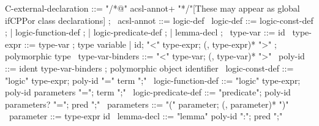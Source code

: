 \begin{syntax}
  C-external-declaration ::= "/*@" acsl-annot+ "*/"[These may appear as global ifCPP{or class} declarations] ;
  \
  acsl-annot ::= logic-def
  \
  logic-def ::= logic-const-def ;
          | logic-function-def ;
          | logic-predicate-def ;
          | lemma-decl ;
  \
  type-var ::= id
  \
  type-expr ::= type-var ; type variable
  | id;
    "<" type-expr;
    (, type-expr)* ">" ; polymorphic type
  \
  type-var-binders ::= "<" type-var;
                       (, type-var)* ">"
  \
  poly-id ::= ident type-var-binders ; polymorphic object identifier
  \
  logic-const-def ::= "logic" type-expr;
    poly-id "=" term ";"
  \
  logic-function-def ::= "logic" type-expr;
  poly-id parameters "=";
  term ";"
  \
  logic-predicate-def ::=
  "predicate";
  poly-id parameters? "=";
  pred ";"
  \
  parameters ::= "(" parameter;
                 (, parameter)* ")"
  \
  parameter ::= type-expr id
  \
  lemma-decl ::= "lemma" poly-id ":";
                   pred ";"
\end{syntax}
